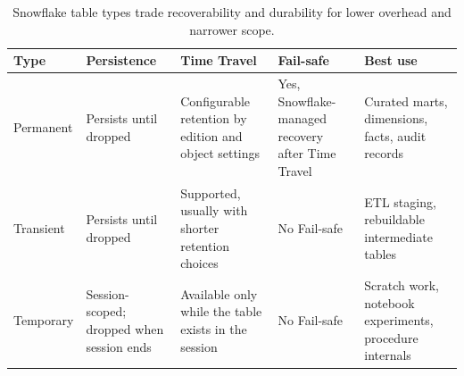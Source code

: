 \begin{table}[H]
\centering
\small
\begin{tabular}{@{}p{2.4cm}p{3.2cm}p{3.2cm}p{3.2cm}p{2.6cm}@{}}
\toprule
\textbf{Type} & \textbf{Persistence} & \textbf{Time Travel} & \textbf{Fail-safe} & \textbf{Best use} \\
\midrule
Permanent & Persists until dropped & Configurable retention by edition and object settings & Yes, Snowflake-managed recovery after Time Travel & Curated marts, dimensions, facts, audit records \\
Transient & Persists until dropped & Supported, usually with shorter retention choices & No Fail-safe & ETL staging, rebuildable intermediate tables \\
Temporary & Session-scoped; dropped when session ends & Available only while the table exists in the session & No Fail-safe & Scratch work, notebook experiments, procedure internals \\
\bottomrule
\end{tabular}
\caption{Snowflake table types trade recoverability and durability for lower overhead and narrower scope.}
\label{tab:chapter3-table-types}
\end{table}
